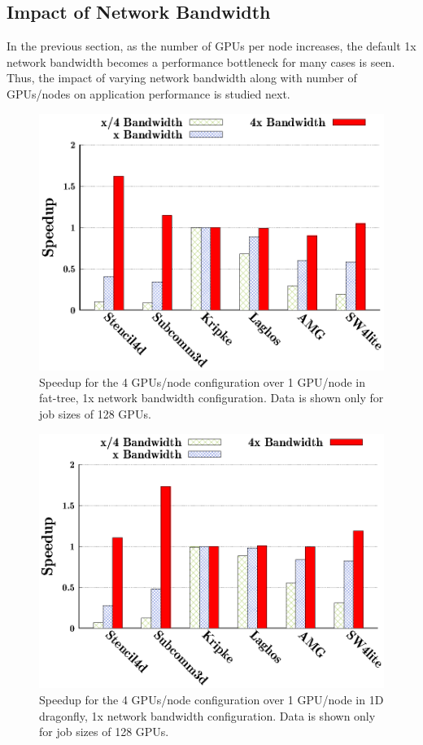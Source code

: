 \subsection{Impact of Network Bandwidth}

In the previous section, as the number of GPUs per node increases, 
the default 1x network bandwidth becomes a performance bottleneck for many
cases is seen.  Thus, the impact of varying network bandwidth along with number of
GPUs/nodes on application performance is studied next. 

\begin{figure}[!htbp]
\centering
    \includegraphics[width=0.8\columnwidth]{figure/plots/bw/ftree-bw-mapping-all.eps}
  \caption{Speedup for the 4 GPUs/node configuration over 1 GPU/node in fat-tree, 1x network
  bandwidth configuration. Data is shown only for job sizes of 128 GPUs.}
  \label{fig:bw_ftree}
\end{figure}

\begin{figure}[!htbp]
\centering
    \includegraphics[width=0.8\columnwidth]{figure/plots/bw/dfly-bw-mapping-all.eps}
  \caption{Speedup for the 4 GPUs/node configuration over 1 GPU/node in 1D dragonfly, 1x network
  bandwidth configuration. Data is shown only for job sizes of 128 GPUs.}
  \label{fig:bw_dfly}
\end{figure}

